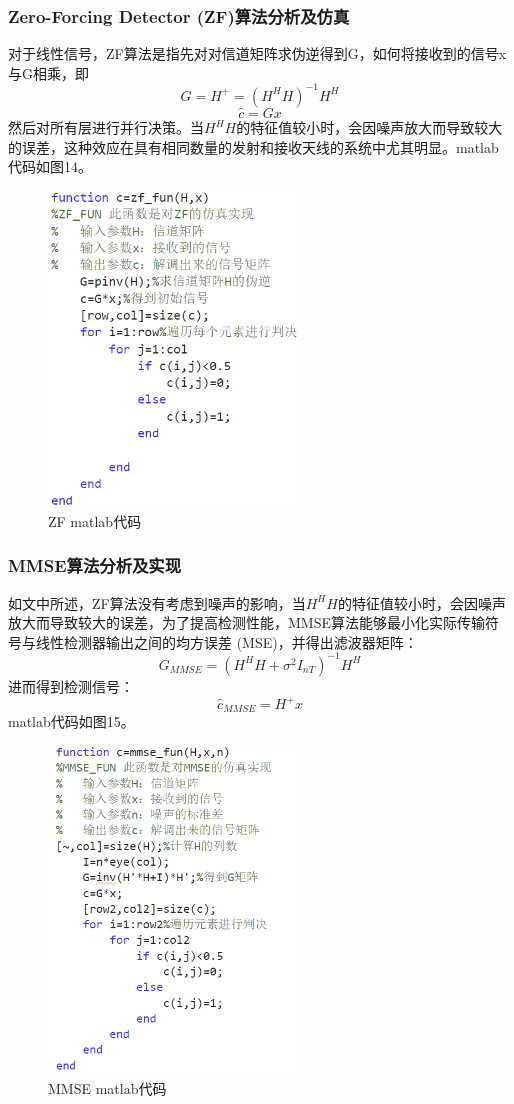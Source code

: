 \documentclass[a4paper,12pt]{article}
\begin{document}
	\subsubsection{Zero-Forcing Detector (ZF)算法分析及仿真}
	对于线性信号，ZF算法是指先对对信道矩阵求伪逆得到G，如何将接收到的信号x与G相乘，即
	$$G=H^{+}=(H^HH)^{-1}H^H$$
	$$\hat{c}=Gx$$
	然后对所有层进行并行决策。当$H^HH$的特征值较小时，会因噪声放大而导致较大的误差，这种效应在具有相同数量的发射和接收天线的系统中尤其明显。matlab代码如图14。
	\begin{figure}[h]
		\centering
		\includegraphics[width=0.6\textwidth]{14.png}
		\caption{ZF matlab代码}
	\end{figure}
	\newpage
	\subsubsection{MMSE算法分析及实现}
	如文中所述，ZF算法没有考虑到噪声的影响，当$H^HH$的特征值较小时，会因噪声放大而导致较大的误差，为了提高检测性能，MMSE算法能够最小化实际传输符号与线性检测器输出之间的均方误差 (MSE)，并得出滤波器矩阵：
	$$G_{MMSE}=(H^HH+\sigma^2I_{nT})^{-1}H^H$$
	进而得到检测信号：
	$$\hat{c}_{MMSE}=H^{+}x$$
	matlab代码如图15。
	\begin{figure}[h]
		\centering
		\includegraphics[width=0.6\textwidth]{15.png}
		\caption{MMSE matlab代码}
	\end{figure}
	\newpage
\end{document}
